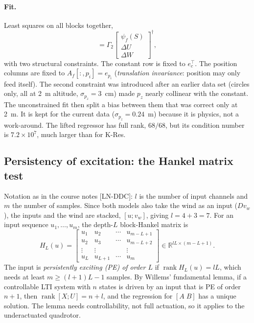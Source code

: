 \documentclass[11pt,a4paper]{article}
\newcommand{\KRes}{\textsf{K-Res}}            %
\begin{document}
	\paragraph{Fit.}
	Least squares on all blocks together,
	\begin{equation}
		[A_f\; B_f\; D_f] = \Gamma_2 \begin{bmatrix} \psi_f(S) \\ \Delta U \\ \Delta W \end{bmatrix}^{\dagger},
	\end{equation}
	with two structural constraints. The constant row is fixed to $e_c^\top$. The position columns are
	fixed to $A_f[:, p_i] = e_{p_i}$ (\emph{translation invariance}: position may only feed itself).
	The second constraint was introduced after an earlier data set (circles only, all at 2~m altitude,
	$\sigma_{p_z} = 3$~cm) made $p_z$ nearly collinear with the constant. The unconstrained fit then
	split a bias between them that was correct only at 2~m. It is kept for the current data
	($\sigma_{p_z} = 0.24$~m) because it is physics, not a work-around. The lifted regressor has full
	rank, $68/68$, but its condition number is $7.2\times10^{7}$, much larger than for \KRes.

	\subsection{Persistency of excitation: the Hankel matrix test}
	\label{sec:pe}

	Notation as in the course notes [LN-DDC]: $l$ is the number of input channels and $m$ the number
	of samples. Since both models also take the wind as an input ($D v_w$), the inputs and the wind
	are stacked, $[u; v_w]$, giving $l = 4 + 3 = 7$. For an input sequence $u_1, \dots, u_m$, the
	depth-$L$ block-Hankel matrix is
	\begin{equation}
		H_L(u) = \begin{bmatrix}
			u_1 & u_2 & \cdots & u_{m-L+1} \\
			u_2 & u_3 & \cdots & u_{m-L+2} \\
			\vdots & \vdots & & \vdots \\
			u_L & u_{L+1} & \cdots & u_m
		\end{bmatrix} \in \mathbb{R}^{lL \times (m-L+1)} .
	\end{equation}
	The input is \emph{persistently exciting (PE) of order $L$} if $\operatorname{rank} H_L(u) = lL$,
	which needs at least $m \ge (l+1)L - 1$ samples. By Willems' fundamental lemma, if a
	controllable LTI system with $n$ states is driven by an input that is PE of order $n + 1$, then
	$\operatorname{rank}[X; U] = n + l$, and the regression for $[A\;B]$ has a unique solution. The
	lemma needs controllability, not full actuation, so it applies to the underactuated quadrotor.
\end{document}
